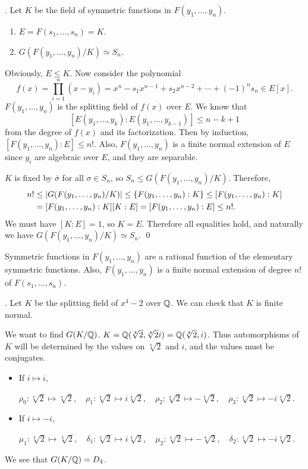 
\thm. Let \(K\) be the field of symmetric functions in \(F(y_1, \dots, y_n)\).
\begin{enumerate}
    \item \(E = F(s_1, \dots, s_n) = K\).
    \item \(G(F(y_1, \dots, y_n)/K) \simeq S_n\).
\end{enumerate}

\pf Obviously, \(E \leq K\). Now consider the polynomial
\[
    f(x) = \prod_{i=1}^n (x - y_i) = x^n - s_1 x^{n-1} + s_2x^{n-2} + \cdots + (-1)^n s_n \in E[x].
\]
\(F(y_1, \dots, y_n)\) is the splitting field of \(f(x)\) over \(E\). We know that
\[
    [E(y_1, \dots, y_k) : E(y_1, \dots, y_{k-1})] \leq n-k+1
\]
from the degree of \(f(x)\) and its factorization. Then by induction, \([F(y_1, \dots, y_n) : E] \leq n!\). Also, \(F(y_1, \dots, y_n)\) is a finite normal extension of \(E\) since \(y_i\) are algebraic over \(E\), and they are separable.

\(K\) is fixed by \(\bar{\sigma}\) for all \(\sigma \in S_n\), so \(S_n \leq G(F(y_1, \dots, y_n)/K)\). Therefore,
\[
    \begin{aligned}
        n! & \leq \left| G(F(y_1, \dots, y_n) / K) \right| \leq \{F(y_1, \dots, y_n) : K\}  \leq [F(y_1, \dots, y_n) : K] \\
           & = [F(y_1, \dots, y_n) : K][K : E]  =[F(y_1, \dots, y_n) : E] \leq n!.
    \end{aligned}
\]
We must have \([K : E] = 1\), so \(K = E\). Therefore all equalities hold, and naturally we have \(G(F(y_1, \dots, y_n)/K) \simeq S_n\). \qed

\rmk Symmetric functions in \(F(y_1, \dots, y_n)\) are a rational function of the elementary symmetric functions. Also, \(F(y_1, \dots, y_n)\) is a finite normal extension of degree \(n!\) of \(F(s_1, \dots, s_n)\).

\ex. Let \(K\) be the splitting field of \(x^4 - 2\) over \(\mathbb{Q}\). We can check that \(K\) is finite normal.

We want to find \(G(K/\mathbb{Q})\). \(K = \mathbb{Q}(\sqrt[4]{2}, \sqrt[4]{2}i) = \mathbb{Q}(\sqrt[4]{2}, i)\). Thus automorphisms of \(K\) will be determined by the values on \(\sqrt[4]{2}\) and \(i\), and the values must be conjugates.
\begin{itemize}
    \item If \(i \mapsto i\),
          \begin{center}
              \(\rho_0 : \sqrt[4]{2} \mapsto \sqrt[4]{2}, \quad \rho_1 : \sqrt[4]{2} \mapsto i\sqrt[4]{2}, \quad  \rho_2 : \sqrt[4]{2} \mapsto -\sqrt[4]{2}, \quad \rho_3 : \sqrt[4]{2} \mapsto -i\sqrt[4]{2}\).
          \end{center}
    \item If \(i \mapsto -i\),
          \begin{center}
              \(\mu_1 : \sqrt[4]{2} \mapsto \sqrt[4]{2}, \quad \delta_1 : \sqrt[4]{2} \mapsto i\sqrt[4]{2}, \quad  \mu_2 : \sqrt[4]{2} \mapsto -\sqrt[4]{2}, \quad \delta_2 : \sqrt[4]{2} \mapsto -i\sqrt[4]{2}\).
          \end{center}
\end{itemize}

We see that \(G(K/\mathbb{Q}) = D_4\).

\smallskip
